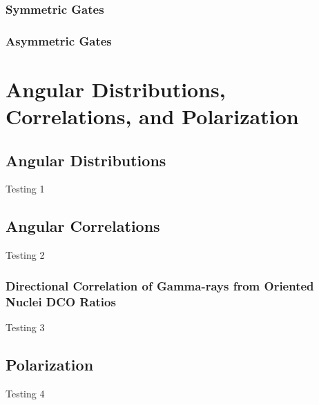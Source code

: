 \subsubsection{Symmetric Gates}
\label{sssec:exp-pr-data-proc-bg-sub-sym}
\subsubsection{Asymmetric Gates}
\label{sssec:exp-pr-data-proc-bg-sub-asym}

\section{Angular Distributions, Correlations, and Polarization}
\label{sec:exp-pr-data-ang}
\subsection{Angular Distributions}
\label{ssec:exp-pr-data-ang-dist}
Testing 1
\subsection{Angular Correlations}
\label{ssec:exp-pr-data-ang-cor}
Testing 2
\subsubsection{Directional Correlation of Gamma-rays from Oriented Nuclei DCO Ratios}
\label{sssec:exp-pr-data-ang-cor-dco}
Testing 3
\subsection{Polarization}
\label{ssec:exp-pr-data-ang-pol}
Testing 4
